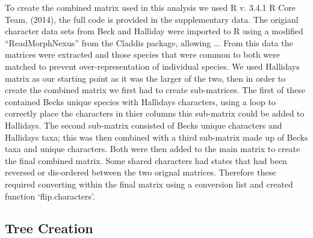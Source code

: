 \documentclass[11pt,letterpaper]{article}
\begin{document}
To create the combined matrix used in this analysis we used R v. 3.4.1 R Core Team, (2014), the full code is provided in the supplementary data. The origianl character data sets from Beck and Halliday were imported to R using a modified ``ReadMorphNexus'' from the Claddis package, allowing ... From this data the matrices were extracted and those species that were common to both were matched to prevent over-representation of individual species. We used Hallidays matrix as our starting point as it was the larger of the two, then in order to create the combined matrix we first had to create sub-matrices. The first of these contained Becks unique species with Hallidays characters, using a loop to correctly place the characters in thier columns this sub-matrix could be added to Hallidays. The second sub-matrix consisted of Becks unique characters and Hallidays taxa; this was then combined with a third sub-matrix made up of Becks taxa and unique characters. Both were then added to the main matrix to create the final combined matrix. Some shared characters had states that had been reversed or dis-ordered between the two orignal matrices. Therefore these required converting within the final matrix using a conversion list and created function `flip.characters'.

\newpage

\subsection{Tree Creation}
\end{document}
